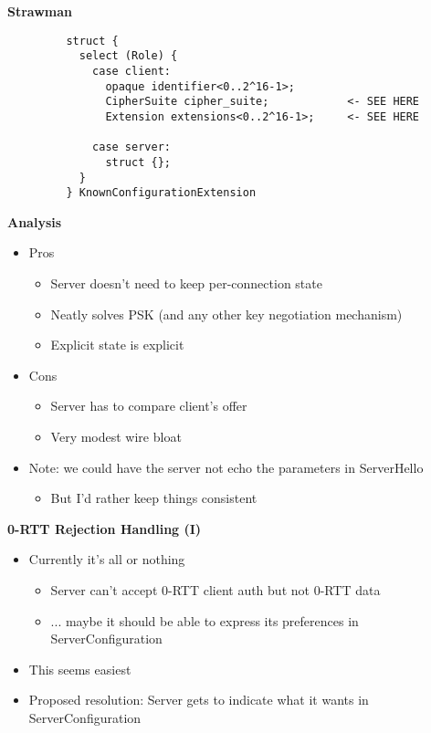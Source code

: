 \documentclass[helvetica]{seminar}
\newcommand{\heading}[1]{%
  \begin{center} 
    \large\bf 
    #1 
  \end{center} 
  \vspace{.4 in}}
\begin{document}
\begin{slide}
\heading{Strawman}

\begin{footnotesize}
\begin{verbatim}
         struct {
           select (Role) {
             case client:
               opaque identifier<0..2^16-1>;
               CipherSuite cipher_suite;            <- SEE HERE
               Extension extensions<0..2^16-1>;     <- SEE HERE       

             case server:
               struct {};
           }
         } KnownConfigurationExtension
\end{verbatim}
\end{footnotesize}
\end{slide}

\begin{slide}
\heading{Analysis}

\begin{itemize}
\item Pros
  \begin{itemize}
  \item Server doesn't need to keep per-connection state
  \item Neatly solves PSK (and any other key negotiation mechanism)
  \item Explicit state is explicit
  \end{itemize}
\item Cons
  \begin{itemize}
  \item Server has to compare client's offer
  \item Very modest wire bloat
  \end{itemize}

\item Note: we could have the server not echo the parameters in ServerHello
  \begin{itemize}
  \item But I'd rather keep things consistent
  \end{itemize}
\end{itemize}
\end{slide}


\begin{slide}
\heading{0-RTT Rejection Handling (I)}

\begin{itemize}
\item Currently it's all or nothing
  \begin{itemize}
  \item Server can't accept 0-RTT client auth but not 0-RTT data
  \item ... maybe it should be able to express its preferences in ServerConfiguration
  \end{itemize}

\item This seems easiest
\item Proposed resolution: Server gets to indicate what it wants in ServerConfiguration
\end{itemize}
\end{slide}
\end{document}
